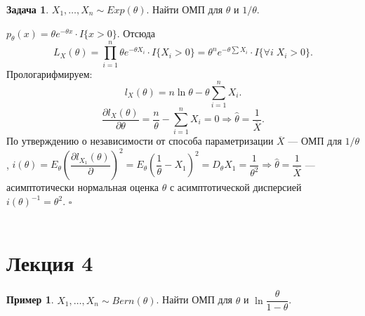 \documentclass[12pt]{report}
\newenvironment{solution}{{\bfseries Решение:}}{$\square$\\\\}
\theoremstyle{definition}
\newtheorem{example}{Пример}
\newtheorem{problem}{Задача}
\begin{document}
\begin{problem}
	$X_1,\ldots,X_n \sim Exp(\theta)$. Найти ОМП для $\theta$ и $1/\theta$.
\end{problem}
\begin{solution}
	$p_\theta(x) = \theta e^{-\theta x}\cdot I\{x>0\}$. Отсюда 
$$L_X(\theta) = \displaystyle{\prod_{i=1}^n}\theta e^{-\theta X_i}\cdot I\{X_i > 0\} = \theta^n e^{-\theta\sum X_i}\cdot I\{\forall i \;X_i > 0\}.$$
Прологарифмируем:
$$l_X(\theta) = n\ln \theta - \theta\sum_{i=1}^n X_i.$$
$$\dfrac{\partial l_X(\theta)}{\partial \theta} = \dfrac{n}{\theta}-\sum_{i = 1}^n X_i = 0 \Rightarrow\hat{\theta} = \dfrac{1}{\overline{X}}.$$
По утверждению о независимости от способа параметризации $\overline{X}$ — ОМП для $1/\theta$, $i(\theta)=E_\theta\left(\dfrac{\partial l_{X_1}(\theta)}{\partial}\right)^2 = E_\theta\left(\dfrac{1}{\theta}-X_1\right)^2 = D_\theta X_1 = \dfrac{1}{\theta^2} \Rightarrow \hat{\theta} = \dfrac{1}{\overline{X}}$ — асимптотически нормальная оценка $\theta$ с асимптотической дисперсией $i(\theta)^{-1} = \theta^2$.
\end{solution}

\section{Лекция 4}
\begin{example}
	$X_1, \ldots, X_n \sim Bern(\theta)$. Найти ОМП для $\theta$ и $\ln \dfrac{\theta}{1-\theta}$.
\end{example}
\end{document}
